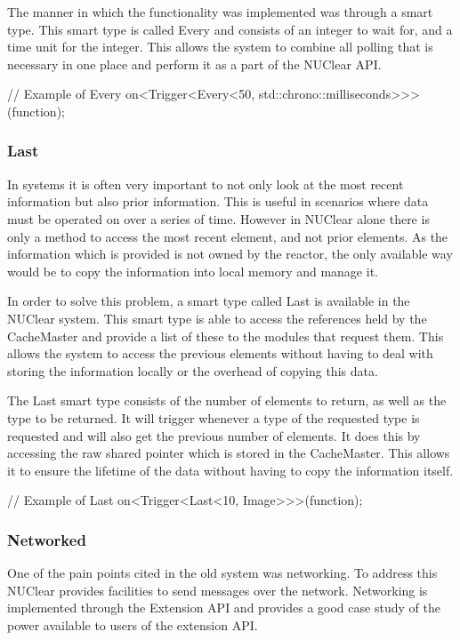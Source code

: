 \documentclass[english,12pt]{scrartcl}
\begin{document}
				The manner in which the functionality was implemented was through a smart type.
				This smart type is called Every and consists of an integer to wait for, and a time unit for the integer.
				This allows the system to combine all polling that is necessary in one place and perform it as a part of the NUClear API.

				\begin{cppcode}
				// Example of Every
				on<Trigger<Every<50, std::chrono::milliseconds>>>(function);
				\end{cppcode}

			\subsubsection{Last}
				In systems it is often very important to not only look at the most recent information but also prior information.
				This is useful in scenarios where data must be operated on over a series of time.
				However in NUClear alone there is only a method to access the most recent element, and not prior elements.
				As the information which is provided is not owned by the reactor, the only available way would be to copy the information into local memory and manage it.

				In order to solve this problem, a smart type called Last is available in the NUClear system.
				This smart type is able to access the references held by the CacheMaster and provide a list of these to the modules that request them.
				This allows the system to access the previous elements without having to deal with storing the information locally or the overhead of copying this data.

				The Last smart type consists of the number of elements to return, as well as the type to be returned.
				It will trigger whenever a type of the requested type is requested and will also get the previous number of elements.
				It does this by accessing the raw shared pointer which is stored in the CacheMaster.
				This allows it to ensure the lifetime of the data without having to copy the information itself.

				\begin{cppcode}
				// Example of Last
				on<Trigger<Last<10, Image>>>(function);
				\end{cppcode}

			\subsubsection{Networked}
				One of the pain points cited in the old system was networking.
				To address this NUClear provides facilities to send messages over the network.
				Networking is implemented through the Extension API and provides a good case study of the power available to users of the extension API.
\end{document}
